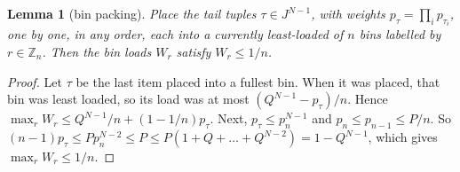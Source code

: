 \documentclass[11pt]{amsart}
\newtheorem{lemma}{Lemma}[section]
\theoremstyle{definition}
\theoremstyle{remark}
\numberwithin{equation}{section}
\begin{document}
\begin{lemma}[bin packing]\label{lem:binN}
Place the tail tuples $\tau\in J^{N-1}$, with weights $p_\tau=\prod_ip_{\tau_i}$, one by one, in any order, each into
a currently least-loaded of $n$ bins labelled by $r\in\mathbb{Z}_n$. Then the bin loads $W_r$ satisfy
$W_r\le1/n$.
\end{lemma}
\begin{proof}
Let $\tau$ be the last item placed into a fullest bin. When it was placed, that bin was least loaded, so its load
was at most $(Q^{N-1}-p_\tau)/n$. Hence $\max_rW_r\le Q^{N-1}/n+(1-1/n)p_\tau$. Next, $p_\tau\le p_n^{N-1}$ and
$p_n\le p_{n-1}\le P/n$. So $(n-1)p_\tau\le Pp_n^{N-2}\le P\le P(1+Q+\dots+Q^{N-2})=1-Q^{N-1}$, which gives
$\max_rW_r\le1/n$.
\end{proof}
\end{document}
